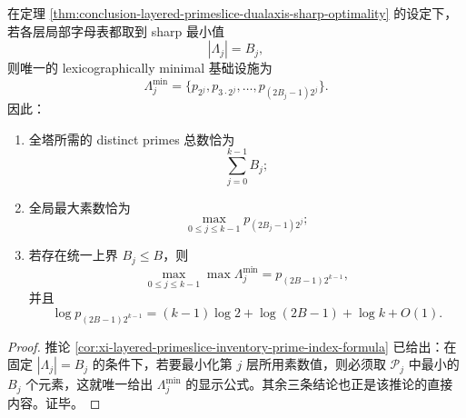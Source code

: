 \begin{theorem}\label{thm:conclusion-layered-primeslice-dyadic-head-law}
在定理 \ref{thm:conclusion-layered-primeslice-dualaxis-sharp-optimality} 的设定下，若各层局部字母表都取到 sharp 最小值
\[
|\Lambda_j|=B_j,
\]
则唯一的 lexicographically minimal 基础设施为
\[
\Lambda_j^{\min}
=
\{p_{2^j},p_{3\cdot 2^j},\dots,p_{(2B_j-1)2^j}\}.
\]
因此：
\begin{enumerate}
  \item 全塔所需的 distinct primes 总数恰为
  \[
  \sum_{j=0}^{k-1}B_j;
  \]
  \item 全局最大素数恰为
  \[
  \max_{0\le j\le k-1}p_{(2B_j-1)2^j};
  \]
  \item 若存在统一上界 \(B_j\le B\)，则
  \[
  \max_{0\le j\le k-1}\max \Lambda_j^{\min}
  =
  p_{(2B-1)2^{k-1}},
  \]
  并且
  \[
  \log p_{(2B-1)2^{k-1}}
  =
  (k-1)\log 2+\log(2B-1)+\log k+O(1).
  \]
\end{enumerate}
\end{theorem}
\begin{proof}
推论 \ref{cor:xi-layered-primeslice-inventory-prime-index-formula} 已给出：在固定 \(|\Lambda_j|=B_j\) 的条件下，若要最小化第 \(j\) 层所用素数值，则必须取 \(\mathcal P_j\) 中最小的 \(B_j\) 个元素，这就唯一给出 \(\Lambda_j^{\min}\) 的显示公式。其余三条结论也正是该推论的直接内容。证毕。
\end{proof}

